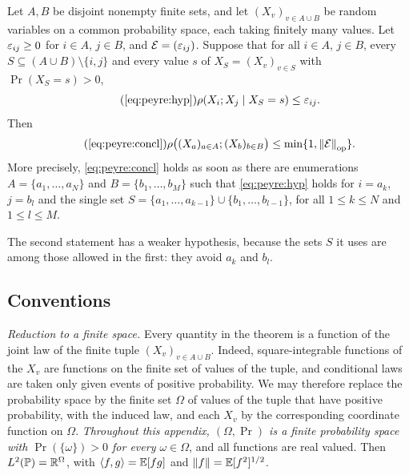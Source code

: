 \begin{theorem*}
Let $A,B$ be disjoint nonempty finite sets, and let $(X_v)_{v\in A\cup B}$
be random variables on a common probability space, each taking finitely many
values. Let $\varepsilon_{ij}\ge0$ for $i\in A$, $j\in B$, and
$\mathcal E=(\varepsilon_{ij})$. Suppose that for all $i\in A$, $j\in B$, every
$S\subseteq(A\cup B)\setminus\{i,j\}$ and every value $s$ of
$X_S=(X_v)_{v\in S}$ with $\Pr(X_S=s)>0$,
\begin{equation}\tag{\ref*{eq:peyre:hyp}}
  \rho(X_i;X_j\mid X_S=s)\le\eps_{ij}.
\end{equation}
Then
\begin{equation}\tag{\ref*{eq:peyre:concl}}
  \rho\big((X_a)_{a\in A};(X_b)_{b\in B}\big)\le\min\{1,\opnorm{\mathcal E}\}.
\end{equation}
More precisely, \eqref{eq:peyre:concl} holds as soon as there are
enumerations $A=\{a_1,\dots,a_N\}$ and $B=\{b_1,\dots,b_M\}$ such that
\eqref{eq:peyre:hyp} holds for $i=a_k$, $j=b_l$ and the single set
$S=\{a_1,\dots,a_{k-1}\}\cup\{b_1,\dots,b_{l-1}\}$, for all $1\le k\le N$
and $1\le l\le M$.
\end{theorem*}

The second statement has a weaker hypothesis, because the sets $S$ it uses
are among those allowed in the first: they avoid $a_k$ and $b_l$.

\subsection{Conventions}\label{sec:peyre:conv}

\emph{Reduction to a finite space.} Every quantity in the theorem is a
function of the joint law of the finite tuple $(X_v)_{v\in A\cup B}$.
Indeed, square-integrable functions of the $X_v$ are functions on the finite
set of values of the tuple, and conditional laws are taken only given events
of positive probability. We may therefore replace the probability space by
the finite set $\Omega$ of values of the tuple that have positive
probability, with the induced law, and each $X_v$ by the corresponding
coordinate function on $\Omega$. \emph{Throughout this appendix,
$(\Omega,\Pr)$ is a finite probability space with $\Pr(\{\omega\})>0$ for
every $\omega\in\Omega$}, and all functions are real valued. Then
$L^2(\mathbb P)=\mathbb R^\Omega$, with $\left\langle f,g\right\rangle=\mathbb E[fg]$ and $\left\|f\right\|=\mathbb E[f^2]^{1/2}$.

